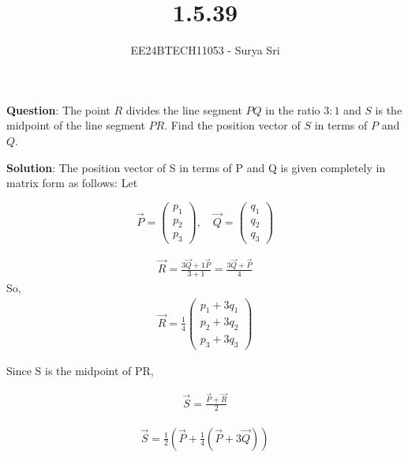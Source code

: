 \documentclass[journal]{IEEEtran}
\begin{document}

\vspace{3cm}

\title{1.5.39}
\author{EE24BTECH11053 - Surya Sri}
{\let\newpage\relax\maketitle}

\renewcommand{\thefigure}{\theenumi}
\renewcommand{\thetable}{\theenumi}
\setlength{\intextsep}{10pt} %

\textbf{Question}:
The point $R$ divides the line segment $PQ$ in the ratio $3:1$ and $S$ is the midpoint of the line segment $PR$. Find the position vector of $S$ in terms of $P$ and $Q$.

\bigskip
\textbf{Solution}:
 The position vector of S in terms of P and Q is given completely in matrix form as follows:
Let

$$
\vec{P} =
\begin{pmatrix}
p_1 \\
p_2 \\
p_3
\end{pmatrix}
,
\quad
\vec{Q} =
\begin{pmatrix}
q_1 \\
q_2 \\
q_3
\end{pmatrix}
$$

\begin{align}
\vec{R} = \frac{3\vec{Q} + 1\vec{P}}{3 + 1} = \frac{3\vec{Q} + \vec{P}}{4}
\end{align}
So,
\begin{align}
\vec{R} =
\frac{1}{4}
\begin{pmatrix}
p_1 + 3q_1 \\
p_2 + 3q_2 \\
p_3 + 3q_3
\end{pmatrix}
\end{align}

Since S is the midpoint of PR,

\begin{align}
\vec{S} = \frac{\vec{P} + \vec{R}}{2}
\end{align}

\begin{align}
\vec{S} = \frac{1}{2} \left( \vec{P} + \frac{1}{4}(\vec{P} + 3\vec{Q}) \right )
\end{align}
\end{document}
